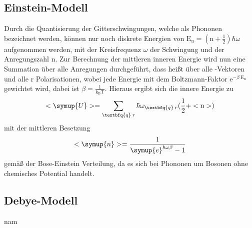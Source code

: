 \subsection{Einstein-Modell}
Durch die Quantisierung der Gitterschwingungen, welche als Phononen bezeichnet
werden, können nur noch diskrete Energien von $ \text{E}_{\text{n}}=(\text{n}+\frac{1}{2})
\hbar \omega $ aufgenommen werden, mit der Kreisfrequenz $\omega$ der Schwingung
und der Anregungszahl n. Zur Berechnung der mittleren inneren Energie wird nun eine Summation
über alle Anregungen durchgeführt, dass heißt über alle
-Vektoren und alle r Polarisationen, wobei jede Energie mit dem Boltzmann-Faktor
$\text{e}^{-\beta \:\text{E}_{\text{n}}}$ gewichtet wird, dabei ist
$\beta= \frac{1}{\text{k}_{\text{B}}\text{T}}$.
Hieraus ergibt sich die innere Energie zu
\begin{equation}
  <\symup{U}> = \sum_{\textbfq{q} \: r}\hbar\omega_{\textbfq{q} \: r}(\frac{1}{2}+<\text{n}>)
  \label{eqn:Uqm}
\end{equation}
mit der mittleren Besetzung
\begin{equation}
  <\symup{n}> =  \frac{1}{\symup{e}^{\hbar\omega\beta}-1}
  \label{eqn:boseeinstein}
\end{equation}
gemäß der Bose-Einstein Verteilung, da es sich bei Phononen um Bosonen ohne
chemisches Potential handelt.




\subsection{Debye-Modell}


nam
